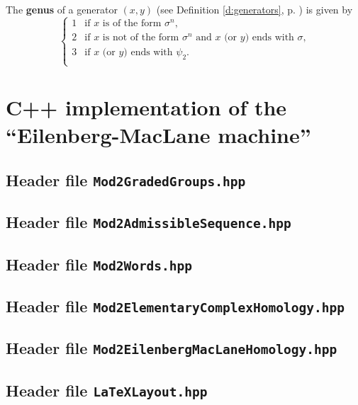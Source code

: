 {The {\bf genus} of a generator $(x,y)$ (see Definition \ref{d:generators}, p. \pageref{d:generators}) is given by
$$
\begin{cases}
1 &\text{if $x$ is of the form $\sigma^n$,}\\
2 &\text{if $x$ is not of the form $\sigma^n$ and $x$ (or $y$) ends with $\sigma$,}\\
3 &\text{if $x$ (or $y$) ends with $\psi_2$.}\\
\end{cases}
$$


\newpage

\newpage

\newpage

\chapter{C++ implementation of the\\ ``Eilenberg-MacLane machine''}\label{a:C++ implementation}

\renewcommand\verbatimtabsize{4\relax}

\section{Header file \texttt{Mod2GradedGroups.hpp}}
{\small
{}
}

\newpage
\section{Header file \texttt{Mod2AdmissibleSequence.hpp}}
{\small
{}
}

\newpage
\section{Header file \texttt{Mod2Words.hpp}}
{\small
{}
}

\newpage
\section{Header file \texttt{Mod2ElementaryComplexHomology.hpp}}
{\small
{}
}

\newpage
\section{Header file \texttt{Mod2EilenbergMacLaneHomology.hpp}}
{\small
{}
}

\newpage
\section{Header file \texttt{LaTeXLayout.hpp}}
{\small
{}
}

}


\endinput